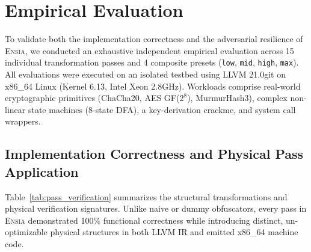 \documentclass[conference]{IEEEtran}
\begin{document}
\section{Empirical Evaluation}
\label{sec:evaluation}

To validate both the implementation correctness and the adversarial resilience of \textsc{Ensia}, we conducted an exhaustive independent empirical evaluation across 15 individual transformation passes and 4 composite presets (\texttt{low}, \texttt{mid}, \texttt{high}, \texttt{max}). All evaluations were executed on an isolated testbed using LLVM 21.0git on x86\_64 Linux (Kernel 6.13, Intel Xeon 2.8GHz). Workloads comprise real-world cryptographic primitives (ChaCha20, AES GF($2^8$), MurmurHash3), complex non-linear state machines (8-state DFA), a key-derivation crackme, and system call wrappers.

\subsection{Implementation Correctness and Physical Pass Application}
Table~\ref{tab:pass_verification} summarizes the structural transformations and physical verification signatures. Unlike naive or dummy obfuscators, every pass in \textsc{Ensia} demonstrated 100\% functional correctness while introducing distinct, un-optimizable physical structures in both LLVM IR and emitted x86\_64 machine code.
\end{document}
